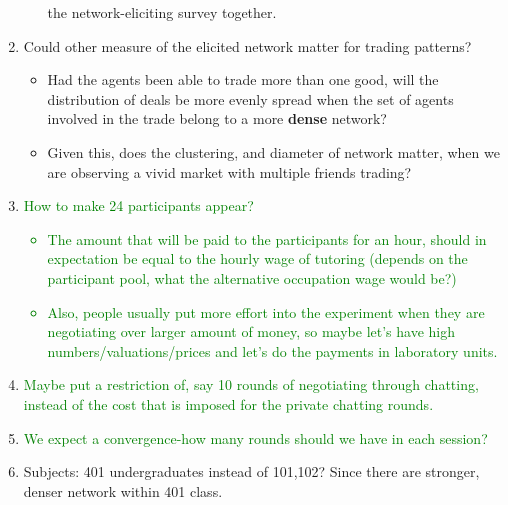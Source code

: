 \documentclass{article}
\begin{document}
\begin{enumerate}
\begin{itemize}
                the network-eliciting survey together.
        \end{itemize}
    \item Could other measure of the elicited network matter for trading
        patterns?
        \begin{itemize}
            \item Had the agents been able to trade more than one good, will the
                distribution of deals be more evenly spread when the set of
                agents involved in the trade belong to a more \textbf{dense}
                network?
            \item Given this, does the clustering, and diameter of network
                matter, when we are observing a vivid market with multiple
                friends trading?
        \end{itemize}
        \item \textcolor{green}{How to make 24 participants appear?
        \begin{itemize}
            \item The amount that will be paid to the participants for an hour, should in expectation be equal to the hourly wage of tutoring (depends on the participant pool, what the alternative occupation wage would be?)
            \item Also, people usually put more effort into the experiment when they are negotiating over larger amount of money, so maybe let's have high numbers/valuations/prices and let's do the payments in laboratory units.
        \end{itemize}}
        
        \item \textcolor{green}{Maybe put a restriction of, say 10 rounds of negotiating through chatting, instead of the cost that is imposed for the private chatting rounds.}
       
       \item \textcolor{green}{We expect a convergence-how many rounds should we have in each session?}
       
       \item Subjects: 401 undergraduates instead of 101,102? Since there are stronger, denser network within 401 class. 

\end{enumerate}




%
%
%
\end{document}
